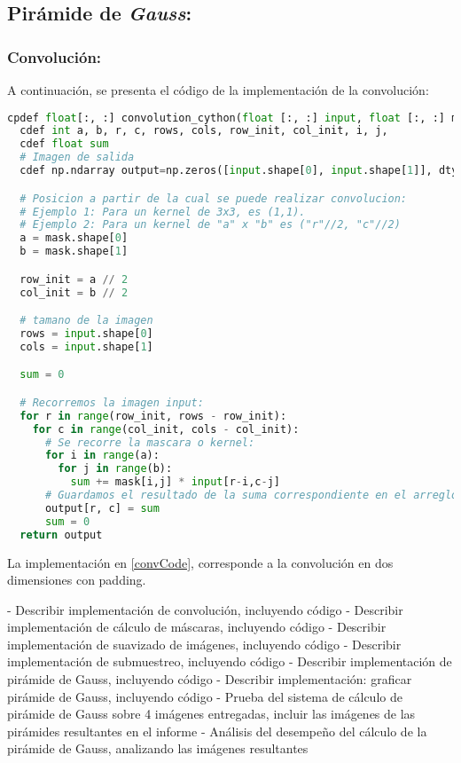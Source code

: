\subsection{Pirámide de \textit{Gauss}:}

\subsubsection*{Convolución:}
\par A continuación, se presenta el código de la implementación de la convolución:

\begin{lstlisting}[language=Python, label = convCode, caption=Implementación de convolución en Cython.]
  cpdef float[:, :] convolution_cython(float [:, :] input, float [:, :] mask):
  cdef int a, b, r, c, rows, cols, row_init, col_init, i, j,
  cdef float sum
  # Imagen de salida
  cdef np.ndarray output=np.zeros([input.shape[0], input.shape[1]], dtype = np.float32)

  # Posicion a partir de la cual se puede realizar convolucion: 
  # Ejemplo 1: Para un kernel de 3x3, es (1,1).
  # Ejemplo 2: Para un kernel de "a" x "b" es ("r"//2, "c"//2)
  a = mask.shape[0]
  b = mask.shape[1]

  row_init = a // 2
  col_init = b // 2

  # tamano de la imagen
  rows = input.shape[0]
  cols = input.shape[1]

  sum = 0

  # Recorremos la imagen input:
  for r in range(row_init, rows - row_init):
    for c in range(col_init, cols - col_init):
      # Se recorre la mascara o kernel:
      for i in range(a):
        for j in range(b):
          sum += mask[i,j] * input[r-i,c-j]
      # Guardamos el resultado de la suma correspondiente en el arreglo output:
      output[r, c] = sum
      sum = 0
  return output
\end{lstlisting}

\par La implementación en \ref{convCode}, corresponde a la convolución en dos dimensiones con padding. 

\par
- Describir implementación de convolución, incluyendo código
- Describir implementación de cálculo de máscaras, incluyendo código
- Describir implementación de suavizado de imágenes, incluyendo código
- Describir implementación de submuestreo, incluyendo código
- Describir implementación de pirámide de Gauss, incluyendo código
- Describir implementación: graficar pirámide de Gauss, incluyendo código
- Prueba del sistema de cálculo de pirámide de Gauss sobre 4 imágenes entregadas, incluir las
imágenes de las pirámides resultantes en el informe
- Análisis del desempeño del cálculo de la pirámide de Gauss, analizando las imágenes resultantes


